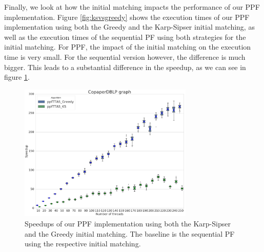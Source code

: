\documentclass[letterpaper]{article}
\begin{document}
Finally, we look at how the initial matching impacts the performance of our PPF implementation. Figure \ref{fig:ksvsgreedy} shows the execution times of our PPF implementation using both the Greedy and the Karp-Sipser initial matching, as well as the execution times of the sequential PF using both strategies for the initial matching. For PPF, the impact of the initial matching on the execution time is very small. For the sequential version however, the difference is much bigger. This leads to a substantial difference in the speedup, as we can see in figure \ref{fig:ksvsgreedy_s}. 

\begin{figure}
	\includegraphics[width=8.3cm]{../../plot/output/report/wikipedia_GREEDYvsKS.png}
	\caption{Speedups of our PPF implementation using both the Karp-Sipser and the Greedy initial matching. The baseline is the sequential PF using the respective initial matching.}
	\label{fig:ksvsgreedy_s}
\end{figure}

%

%
\end{document}
